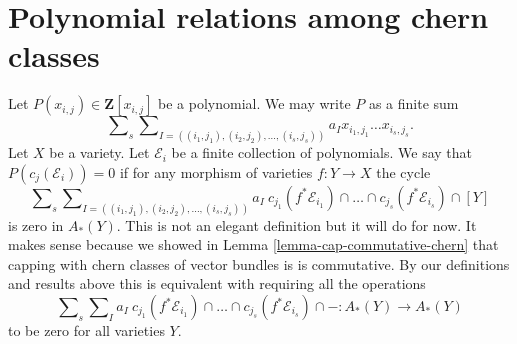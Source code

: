 \section{Polynomial relations among chern classes}
\label{section-relations-chern-classes}

\noindent
Let $P(x_{i, j}) \in \mathbf{Z}[x_{i, j}]$ be a polynomial.
We may write $P$ as a finite sum
$$
\sum\nolimits_s
\sum\nolimits_{I = ((i_1, j_1), (i_2, j_2), \ldots, (i_s, j_s))}
a_I x_{i_1, j_1} \ldots x_{i_s, j_s}.
$$
Let $X$ be a variety. Let $\mathcal{E}_i$ be a finite collection
of polynomials. We say that $P(c_j(\mathcal{E}_i)) = 0$
if for any morphism of varieties $f : Y \to X$ the cycle
$$
\sum\nolimits_s
\sum\nolimits_{I = ((i_1, j_1), (i_2, j_2), \ldots, (i_s, j_s))}
a_I\ c_{j_1}(f^*\mathcal{E}_{i_1}) \cap \ldots
\cap c_{j_s}(f^*\mathcal{E}_{i_s}) \cap [Y]
$$
is zero in $A_*(Y)$. This is not an elegant definition but it will do
for now. It makes sense because we showed in
Lemma \ref{lemma-cap-commutative-chern} that
capping with chern classes of vector bundles is is commutative.
By our definitions and results above
this is equivalent with requiring all the
operations
$$
\sum\nolimits_s
\sum\nolimits_I
a_I\ c_{j_1}(f^*\mathcal{E}_{i_1}) \cap \ldots
\cap c_{j_s}(f^*\mathcal{E}_{i_s}) \cap - :
A_*(Y) \to A_*(Y)
$$
to be zero for all varieties $Y$.

